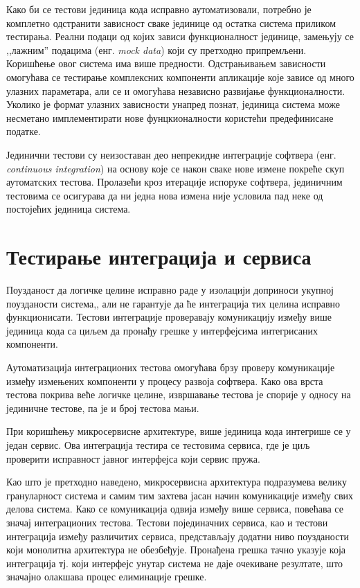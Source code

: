 \documentclass[12pt,oneside]{memoir}
\begin{document}
Како би се тестови јединица кода исправно аутоматизовали, потребно је комплетно одстранити зависност сваке јединице од остатка система приликом тестирања. Реални подаци од којих зависи функционалност јединице, замењују се ,,лажним” подацима (енг.\textit{ mock data}) који су претходно припремљени. Коришћење овог система има више предности. Одстрањивањем зависности омогућава се тестирање комплексних компоненти апликације које зависе од много улазних параметара, али се и омогућава независно развијање функционалности. Уколико је формат улазних зависности унапред познат, јединица система може несметано имплементирати нове фунцкионалности користећи предефинисане податке.

Јединични тестови су неизоставан део непрекидне интеграције софтвера (енг. \textit{continuous integration}) на основу које се након сваке нове измене покреће скуп аутоматских тестова. Пролазећи кроз итерације испоруке софтвера, јединичним тестовима се осигурава да ни једна нова измена није условила пад неке од постојећих јединица система.

\section{Тестирање интеграција и сервиса}

Поузданост да логичке целине исправно раде у изолацији доприноси укупној поузданости система,, али не гарантује да ће интеграција тих целина исправно функционисати. Тестови интеграције проверавају комуникацију између више јединица кода са циљем да пронађу грешке у интерфејсима интегрисаних компоненти.

Аутоматизација интеграционих тестова омогућава брзу проверу комуникације између измењених компоненти у процесу развоја софтвера. Како ова врста тестова покрива веће логичке целине, извршавање тестова је спорије у односу на јединичне тестове, па је и број тестова мањи. 

При коришћењу микросервисне архитектуре, више јединица кода интегрише се у један сервис. Ова интеграција тестира се тестовима сервиса, где је циљ проверити исправност јавног интерфејса који сервис пружа. 

Као што је претходно наведено, микросервисна архитектура подразумева велику грануларност система и самим тим захтева јасан начин комуникације између свих делова система. Како се комуникација одвија између више сервиса, повећава се значај интеграционих тестова. Тестови појединачних сервиса, као и тестови интеграција између различитих сервиса, представљају додатни ниво поузданости који монолитна архитектура не обезбеђује. Пронађена грешка тачно указује која интеграција тј. који интерфејс унутар система не даје очекиване резултате, што значајно олакшава процес елиминације грешке.
\end{document}
